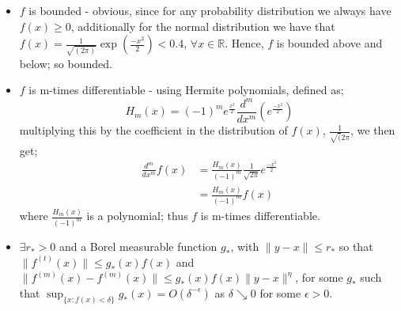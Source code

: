 \documentclass{report}
\begin{document}
\begin{itemize}
\item $f$ is bounded - obvious, since for any probability distribution we always have $f(x) \geq 0$, additionally for the normal distribution we have that $f(x) = \frac{1}{\sqrt{(2\pi)}} \exp{ \left( \frac{-x^2}{2} \right)} < 0.4$, $\forall x \in \mathbb{R}$. Hence, $f$ is bounded above and below; so bounded.

\item $f$ is m-times differentiable - using Hermite polynomials, defined as;
\begin{equation}
H_{m}(x) = (-1)^m e^{\frac{x^2}{2}} \frac{d^m}{dx^m} \left(e^{\frac{-x^2}{2}} \right) \nonumber
\end{equation}
multiplying this by the coefficient in the distribution of $f(x)$, $\frac{1}{\sqrt(2 \pi}$, we then get;
\begin{align*}
 \frac{d^m}{dx^m} f(x) &= \frac{H_{m}(x)}{(-1)^m} \frac{1}{\sqrt{2 \pi}} e^{\frac{-x^2}{2}} \\ 
&= \frac{H_{m}(x)}{(-1)^m} f(x) 
\end{align*}
where $\frac{H_{m}(x)}{(-1)^m}$ is a polynomial; thus $f$ is m-times differentiable.

\item $\exists r_{*} > 0$ and a Borel measurable function $g_{*}$, with $\|y-x\| \leq r_{*}$ so that $\|f^{(t)}(x)\| \leq g_{*}(x) f(x)$ and $\|f^{(m)}(x) - f^{(m)}(x)\| \leq g_{*}(x) f(x)\|y - x\|^{\eta}$, for some $g_{*}$ such that $\sup_{\{x : f(x) < \delta\}} g_{*}(x) = O(\delta^{-\epsilon})$ as $\delta \searrow 0$ for some $\epsilon >0$. 


\end{itemize}
\end{document}
